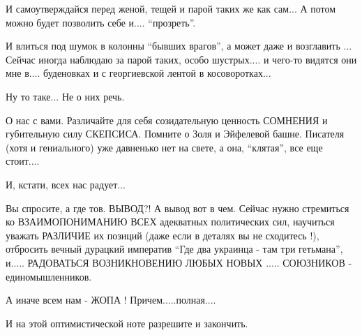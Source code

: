 И самоутверждайся перед женой, тещей и парой таких же как сам... А потом можно
будет позволить себе и.... \enquote{прозреть}. 

И влиться под шумок в колонны \enquote{бывших врагов}, а может даже и возглавить ...
Сейчас иногда наблюдаю за парой таких, особо шустрых.... и чего-то видятся они
мне в.... буденовках и с георгиевской лентой в косоворотках...

Ну то таке... Не о них речь.

О нас с вами. Различайте для себя созидательную ценность СОМНЕНИЯ и губительную
силу СКЕПСИСА. Помните о Золя и Эйфелевой башне. Писателя (хотя и гениального)
уже давненько нет на свете, а она, \enquote{клятая}, все еще стоит.... 

И, кстати, всех нас радует... 

Вы спросите, а где тов. ВЫВОД?! А вывод вот в чем. Сейчас нужно стремиться ко
ВЗАИМОПОНИМАНИЮ ВСЕХ адекватных политических сил, научиться уважать РАЗЛИЧИЕ их
позиций (даже если в деталях вы не сходитесь !), отбросить вечный дурацкий
императив \enquote{Где два украинца - там три гетьмана}, и..... РАДОВАТЬСЯ
ВОЗНИКНОВЕНИЮ ЛЮБЫХ НОВЫХ .....  СОЮЗНИКОВ - единомышленников. 

А иначе всем нам - ЖОПА ! Причем.....полная....

И на этой оптимистической ноте разрешите и закончить.
